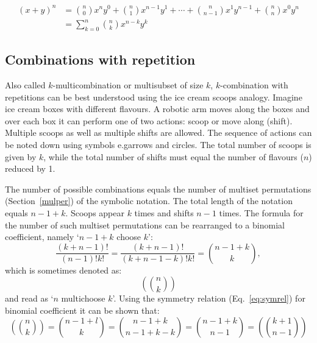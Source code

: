 \documentclass{article}
\makeatletter
\newcommand*{\eg}{e.g\@ifnextchar{.}{}{.\@\xspace}}
\makeatother
\begin{document}
\begin{equation}
    \label{eq:binexp}
    \begin{split}
        (x+y)^n & = \binom{n}{0} x^n y^0 + \binom{n}{1} x^{n-1} y^1 + \dotsb + \binom{n}{n-1} x^1 y^{n-1} + \binom{n}{n} x^0 y^n \\
                & = \sum_{k=0}^{n} \binom{n}{k} x^{n-k} y^k
    \end{split}
\end{equation}

\subsection{Combinations with repetition}

Also called $k$\nobreakdash-\hspace{0pt}multicombination or multisubset of size $k$, $k$\nobreakdash-\hspace{0pt}combination with repetitions can be best understood using the ice cream scoops analogy.\cite{mathsisfun}
Imagine ice cream boxes with different flavours.
A robotic arm moves along the boxes and over each box it can perform one of two actions: scoop or move along (shift).
Multiple scoops as well as multiple shifts are allowed.
The sequence of actions can be noted down using symbols \eg arrows and circles.
The total number of scoops is given by $k$, while the total number of shifts must equal the number of flavours ($n$) reduced by 1.

The number of possible combinations equals the number of multiset permutations (Section~\ref{mulper}) of the symbolic notation.
The total length of the notation equals $n-1+k$.
Scoops appear $k$ times and shifts $n-1$ times.
The formula for the number of such multiset permutations can be rearranged to a binomial coefficient, namely `$n-1+k$ choose $k$':
%
\begin{equation}
    \frac{(k+n-1)!}{(n-1)!k!} = \frac{(k+n-1)!}{(k+n-1-k)!k!} = \binom{n-1+k}{k},
\end{equation}
%
which is sometimes denoted as:
%
\begin{equation*}
    \left(\!\!\!\binom{n}{k}\!\!\!\right)
\end{equation*}
%
and read as `$n$ multichoose $k$'. Using the symmetry relation (Eq.~\ref{eq:symrel}) for binomial coefficient it can be shown that:
%
\begin{equation}
    \left(\!\!\!\binom{n}{k}\!\!\!\right) = \binom{n-1+l}{k} = \binom{n-1+k}{n-1+k-k} = \binom{n-1+k}{n-1} = \left(\!\!\!\binom{k+1}{n-1}\!\!\!\right)
\end{equation}
\end{document}
